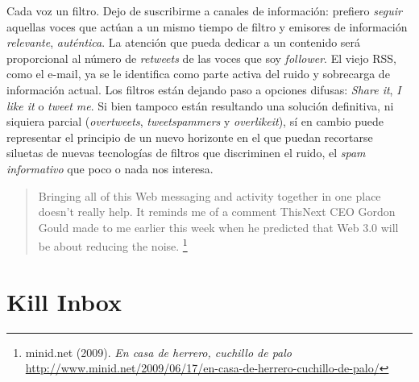 \documentclass[12pt, a4paper,twoside]{book}
\newcommand{\chap}[1]{\newpage\thispagestyle{empty}\chapter{#1}\label{chap:\thechapter}}
\begin{document}
Cada voz un filtro. Dejo de suscribirme a canales de información:
prefiero \emph{seguir} aquellas voces que actúan a un mismo tiempo
de filtro y emisores de información \emph{relevante},
\emph{auténtica}. La atención que pueda dedicar a un contenido será
proporcional al número de \emph{retweets} de las voces que soy
\emph{follower}. El viejo RSS, como el e-mail, ya se le identifica
como parte activa del ruido y sobrecarga de información actual. Los
filtros están dejando paso a opciones difusas: \emph{Share it},
\emph{I like it} o \emph{tweet me}. Si bien tampoco están
resultando una solución definitiva, ni siquiera parcial
(\emph{overtweets}, \emph{tweetspammers} y \emph{overlikeit}), sí
en cambio puede representar el principio de un nuevo horizonte en
el que puedan recortarse siluetas de nuevas tecnologías de filtros
que discriminen el ruido, el \emph{spam informativo} que poco o
nada nos interesa.

\begin{quote}
Bringing all of this Web messaging and activity together in one
place doesn't really help. It reminds me of a comment ThisNext CEO
Gordon Gould made to me earlier this week when he predicted that
Web 3.0 will be about reducing the noise.%
\footnote{minid.net (2009). \emph{En casa de herrero, cuchillo de palo}
\href{http://www.minid.net/2009/06/17/en-casa-de-herrero-cuchillo-de-palo/}{http://www.minid.net/2009/06/17/en-casa-de-herrero-cuchillo-de-palo/}}

\end{quote}
\chap{Kill Inbox}
\end{document}
